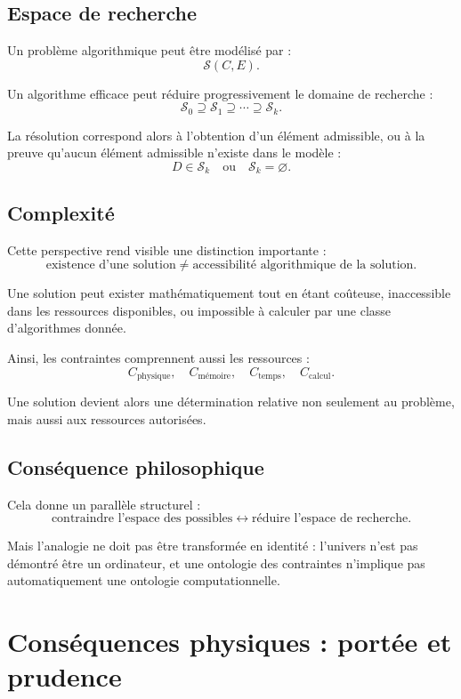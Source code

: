 \documentclass[11pt,a4paper]{article}
\begin{document}
\subsection{Espace de recherche}

Un problème algorithmique peut être modélisé par :
\[
\mathcal S(C,E).
\]

Un algorithme efficace peut réduire progressivement le domaine de recherche :
\[
\mathcal S_0\supseteq\mathcal S_1\supseteq\cdots\supseteq\mathcal S_k.
\]

La résolution correspond alors à l'obtention d'un élément admissible, ou à
la preuve qu'aucun élément admissible n'existe dans le modèle :
\[
D\in\mathcal S_k
\quad\text{ou}\quad
\mathcal S_k=\varnothing.
\]

\subsection{Complexité}

Cette perspective rend visible une distinction importante :
\[
\text{existence d'une solution}\neq\text{accessibilité algorithmique de la solution}.
\]

Une solution peut exister mathématiquement tout en étant coûteuse,
inaccessible dans les ressources disponibles, ou impossible à calculer par
une classe d'algorithmes donnée.

Ainsi, les contraintes comprennent aussi les ressources :
\[
C_{\mathrm{physique}},\quad
C_{\mathrm{mémoire}},\quad
C_{\mathrm{temps}},\quad
C_{\mathrm{calcul}}.
\]

Une solution devient alors une détermination relative non seulement au
problème, mais aussi aux ressources autorisées.

\subsection{Conséquence philosophique}

Cela donne un parallèle structurel :
\[
\boxed{
\text{contraindre l'espace des possibles}
\longleftrightarrow
\text{réduire l'espace de recherche}.
}
\]

Mais l'analogie ne doit pas être transformée en identité : l'univers n'est
pas démontré être un ordinateur, et une ontologie des contraintes n'implique
pas automatiquement une ontologie computationnelle.

\section{Conséquences physiques : portée et prudence}
\end{document}

